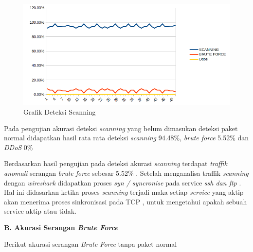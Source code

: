 		\begin{figure}[H]
			\centering
			\includegraphics[scale = 0.8]{gambar/scaning}
			\caption{Grafik Deteksi Scanning}
			\label{Grafik Deteksi Scanning}
		\end{figure}
	
	
	Pada pengujian akurasi deteksi \emph{scanning} yang belum dimasukan deteksi paket normal didapatkan hasil rata rata deteksi \emph{scanning} 94.48\%, \emph{brute force} 5.52\% dan \emph{DDoS} 0\% 
	
	Berdasarkan hasil pengujian pada deteksi akurasi \emph{scanning} terdapat \emph{traffik anomali} serangan \emph{brute force} sebesar 5.52\% . Setelah menganalisa traffik \emph{scanning} dengan \emph{wireshark} didapatkan proses \emph{syn / syncronise} pada service \emph{ssh dan ftp } . Hal ini didasarkan ketika proses \emph{scanning} terjadi maka setiap \emph{service} yang aktip akan menerima proses sinkronisasi pada TCP , untuk mengetahui apakah sebuah service aktip atau tidak. 
	
		\newpage
		\noindent
		\textbf{B. Akurasi Serangan \emph{Brute Force}}
	
		Berikut akurasi serangan \emph{Brute Force} tanpa paket normal
		
